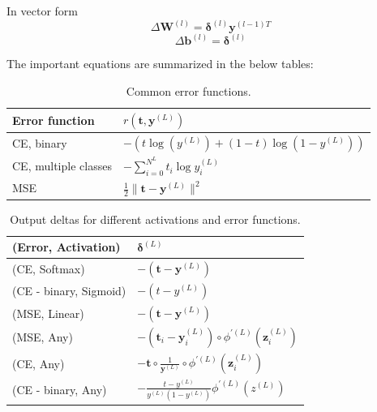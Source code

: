 \documentclass[a4paper,10pt]{article}
\theoremstyle{definition}
\begin{document}
In vector form
\begin{equation}
\Delta\pmb{W}^{(l)} = \pmb{\delta}^{(l)} \pmb{y}^{(l-1)T}
\end{equation}
\begin{equation}
\Delta \pmb{b}^{(l)} = \pmb{\delta}^{(l)}
\end{equation}

The important equations are summarized in the below tables:

\begin{table}[H]
	\centering
	\begin{tabular}{|p{4cm}| l|}
		\hline
		Error function & $r(\pmb{t}, \pmb{y}^{(L)})$ \\
		\hline
		CE, binary& $-(t \log(y^{(L)}) + (1 - t)\log(1 - y^{(L)}))$\\
		\hline
		CE, multiple classes& $- \sum_{i = 0}^{N^L} t_i \log{y^{(L)}_i}$\\
		\hline
		MSE & $\frac{1}{2} \| \pmb{t} - \pmb{y}^{(L)} \|^2$\\
		\hline
	\end{tabular}
	\caption{Common error functions.}
\end{table}

\begin{table}[H]
	\centering
	\begin{tabular}{|p{4cm}| l|}
		\hline
		(Error, Activation) & $\pmb{\delta}^{(L)}$ \\
		\hline
		(CE, Softmax) & $- (\pmb{t} - \pmb{y}^{(L)})$ \\
		\hline
		(CE - binary, Sigmoid) & $- (t - y^{(L)})$ \\
		\hline
		(MSE, Linear) & $- (\pmb{t} - \pmb{y}^{(L)})$ \\
		\hline
		(MSE, Any) & $ -(\pmb{t}_i - \pmb{y}_i^{(L)}) \circ \phi^{'(L)}(\pmb{z}_i^{(L)})$ \\
		\hline
		(CE, Any) & $- \pmb{t} \circ \frac{1}{\pmb{y}^{(L)}}\circ \phi^{'(L)}(\pmb{z}_i^{(L)})$ \\
		\hline
		(CE - binary, Any) & $-\frac{t - y^{(L)}}{y^{(L)}(1 - y^{(L)})} \phi^{'(L)}(z^{(L)})$ \\
		\hline			
	\end{tabular}
	\label{tab:outputDeltaMLP}
	\caption{Output deltas for different activations and error functions.}
\end{table}
\end{document}
